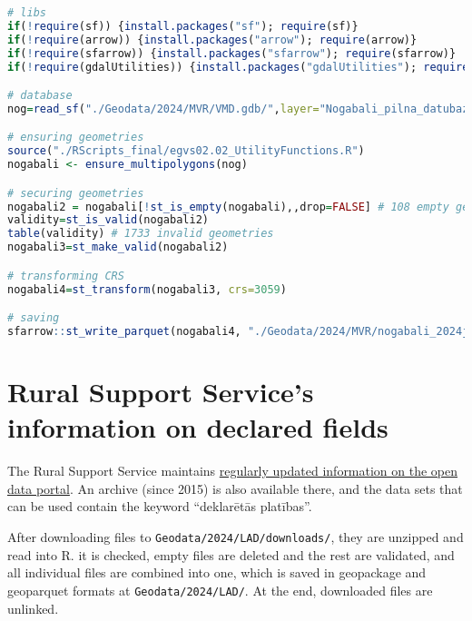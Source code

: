 \documentclass[
]{book}
\newcommand{\passthrough}[1]{#1}
\begin{document}
\begin{lstlisting}[language=R]
# libs
if(!require(sf)) {install.packages("sf"); require(sf)}
if(!require(arrow)) {install.packages("arrow"); require(arrow)}
if(!require(sfarrow)) {install.packages("sfarrow"); require(sfarrow)}
if(!require(gdalUtilities)) {install.packages("gdalUtilities"); require(gdalUtilities)}

# database
nog=read_sf("./Geodata/2024/MVR/VMD.gdb/",layer="Nogabali_pilna_datubaze")

# ensuring geometries
source("./RScripts_final/egvs02.02_UtilityFunctions.R")
nogabali <- ensure_multipolygons(nog)

# securing geometries
nogabali2 = nogabali[!st_is_empty(nogabali),,drop=FALSE] # 108 empty geometries
validity=st_is_valid(nogabali2) 
table(validity) # 1733 invalid geometries
nogabali3=st_make_valid(nogabali2)

# transforming CRS
nogabali4=st_transform(nogabali3, crs=3059)

# saving
sfarrow::st_write_parquet(nogabali4, "./Geodata/2024/MVR/nogabali_2024janv.parquet")
\end{lstlisting}

\section{Rural Support Service's information on declared fields}\label{Ch04.02}

The Rural Support Service maintains \href{https://data.gov.lv/dati/lv/organization/lad}{regularly updated information on the open
data portal}. An archive (since 2015) is
also available there, and the data sets that can be used contain the keyword ``deklarētās platības''.

After downloading files to \passthrough{\lstinline!Geodata/2024/LAD/downloads/!}, they are unzipped and read into R.
it is checked, empty files are deleted and the rest are validated, and all individual
files are combined into one, which is saved in geopackage and geoparquet formats
at \passthrough{\lstinline!Geodata/2024/LAD/!}. At the end, downloaded files are unlinked.
\end{document}
